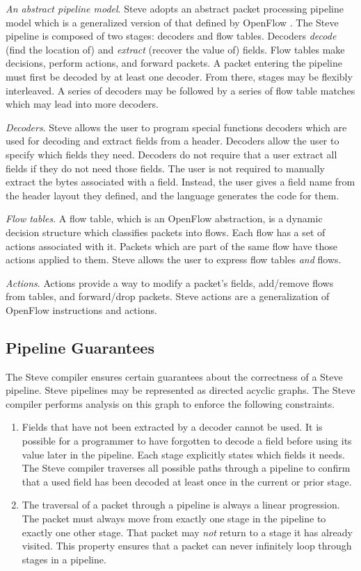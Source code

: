 \emph{An abstract pipeline model}. Steve adopts an abstract packet processing pipeline model which is a generalized version of that defined by OpenFlow \cite{openflow_spec}. The Steve pipeline is composed of two stages: decoders and flow tables. Decoders \textit{decode} (find the location of) and \textit{extract} (recover the value of) fields. Flow tables make decisions, perform actions, and forward packets. A packet entering the pipeline must first be decoded by at least one decoder. From there, stages may be flexibly interleaved. A series of decoders may be followed by a series of flow table matches which may lead into more decoders.

\emph{Decoders}. Steve allows the user to program special functions decoders which are used for decoding and extract fields from a header. Decoders allow the user to specify which fields they need. Decoders do not require that a user extract all fields if they do not need those fields. The user is not required to manually extract the bytes associated with a field. Instead, the user gives a field name from the header layout they defined, and the language generates the code for them.

\emph{Flow tables}. A flow table, which is an OpenFlow abstraction, is a dynamic decision structure which classifies packets into flows. Each flow has a set of actions associated with it. Packets which are part of the same flow have those actions applied to them. Steve allows the user to express flow tables \textit{and} flows.

\emph{Actions}. Actions provide a way to modify a packet's fields, add/remove flows from tables, and forward/drop packets. Steve actions are a generalization of OpenFlow instructions and actions.


\subsection{Pipeline Guarantees}

The Steve compiler ensures certain guarantees about the correctness of a Steve pipeline. Steve pipelines may be represented as directed acyclic graphs. The Steve compiler performs analysis on this graph to enforce the following constraints.

\begin{enumerate}
\item Fields that have not been extracted by a decoder cannot be used. It is possible for a programmer to have forgotten to decode a field before using its value later in the pipeline. Each stage explicitly states which fields it needs. The Steve compiler traverses all possible paths through a pipeline to confirm that a used field has been decoded at least once in the current or prior stage.

\item The traversal of a packet through a pipeline is always a linear progression. The packet must always move from exactly one stage in the pipeline to exactly one other stage. That packet may \textit{not} return to a stage it has already visited. This property ensures that a packet can never infinitely loop through stages in a pipeline.
\end{enumerate}


